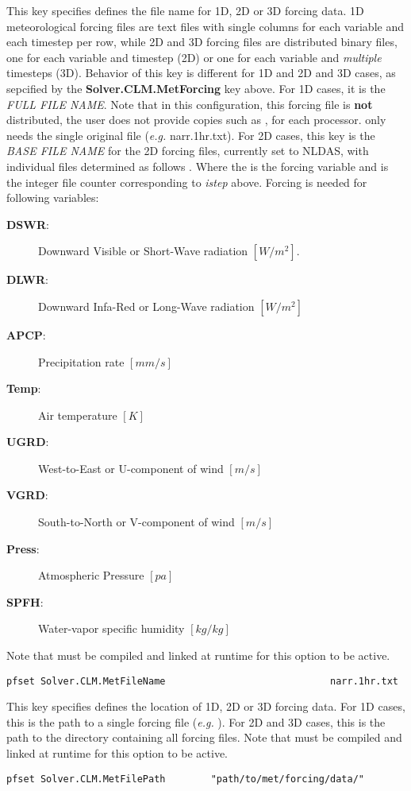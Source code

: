 {This key specifies defines the file name for 1D, 2D or 3D forcing data.  1D meteorological forcing files are text files with single columns for each variable and each timestep per row, while 2D and 3D forcing files are distributed \parflow{} binary files, one for each variable and timestep (2D) or one for each variable and \emph{multiple} timesteps (3D). Behavior of this key is different for 1D and 2D and 3D cases, as sepcified by the {\bf Solver.CLM.MetForcing} key above. For 1D cases, it is the {\em FULL FILE NAME}. Note that in this configuration, this forcing file is {\bf not} distributed,  the user does not provide copies such as ,  for each processor.  \parflow{} only needs the single original file ({\em e.g.} narr.1hr.txt).  For 2D cases, this key is the {\em BASE FILE NAME} for the 2D forcing files, currently set to NLDAS, with individual files determined as follows . Where the  is the forcing variable and  is the integer file counter corresponding to {\em istep} above. Forcing is needed for following variables:
\begin{description}
\item[{\bf DSWR}: ] Downward Visible or Short-Wave radiation $[W/m^2]$.
\item[{\bf DLWR}: ] Downward Infa-Red or Long-Wave radiation $[W/m^2]$
\item[{\bf APCP}: ] Precipitation rate $[mm/s]$
\item[{\bf Temp}: ] Air temperature $[K]$
\item[{\bf UGRD}: ] West-to-East or U-component of wind $[m/s]$
\item[{\bf VGRD}: ] South-to-North or V-component of wind $[m/s]$
\item[{\bf Press}: ] Atmospheric Pressure $[pa]$
\item[{\bf SPFH}: ] Water-vapor specific humidity $[kg/kg]$
\label{clm_forcing}
\end{description}
Note that  must be compiled and linked at runtime for this option to be active.
}
\begin{display}\begin{verbatim}
pfset Solver.CLM.MetFileName                             narr.1hr.txt
\end{verbatim}\end{display}

{This key specifies defines the location of 1D, 2D or 3D forcing data. For 1D cases, this is the path to a single forcing file ({\em e.g.}
). For 2D and 3D cases, this is the path to the directory
containing all forcing files. Note that  must be compiled and linked at runtime for this option to be active.
}
\begin{display}\begin{verbatim}
pfset Solver.CLM.MetFilePath		"path/to/met/forcing/data/"
\end{verbatim}\end{display}

